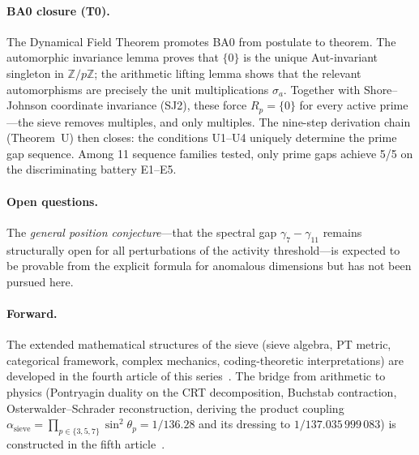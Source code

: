 \documentclass[12pt,a4paper]{article}
\begin{document}
\paragraph{BA0 closure (T0).}
The Dynamical Field Theorem promotes BA0 from postulate to theorem.
The automorphic invariance lemma proves that $\{0\}$ is the unique
Aut-invariant singleton in $\mathbb{Z}/p\mathbb{Z}$; the arithmetic
lifting lemma shows that the relevant automorphisms are precisely the
unit multiplications $\sigma_a$.  Together with Shore--Johnson
coordinate invariance (SJ2), these force $R_p = \{0\}$ for every
active prime---the sieve removes multiples, and only multiples.
The nine-step derivation chain (Theorem~U) then closes:
the conditions U1--U4 uniquely determine the prime gap sequence.
Among 11 sequence families tested, only prime gaps achieve 5/5 on the
discriminating battery E1--E5.

\paragraph{Open questions.}
The \emph{general position conjecture}---that the spectral gap
$\gamma_7 - \gamma_{11}$ remains structurally open for all
perturbations of the activity threshold---is expected to be provable
from the explicit formula for anomalous dimensions but has not been
pursued here.

\paragraph{Forward.}
The extended mathematical structures of the sieve (sieve algebra, PT
metric, categorical framework, complex mechanics, coding-theoretic
interpretations) are developed in the fourth article of this
series~\cite{companion_M4}.  The bridge from arithmetic to physics
(Pontryagin duality on the CRT decomposition, Buchstab contraction,
Osterwalder--Schrader reconstruction, deriving the product coupling
$\alpha_{\mathrm{sieve}} = \prod_{p \in \{3,5,7\}} \sin^2\!\theta_p
= 1/136.28$ and its dressing to $1/137.035\,999\,083$) is constructed
in the fifth article~\cite{companion_M5}.




\end{document}
